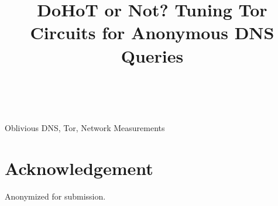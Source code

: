 \documentclass[10pt, confrerence, letterpaper]{ieeetrans}
\begin{document}
\title{DoHoT or Not? Tuning Tor Circuits for Anonymous DNS Queries}

\author{ \\
}




%
\maketitle              %
\IEEEpeerreviewmaketitle


\begin{IEEEkeywords}
Oblivious DNS, Tor, Network Measurements
\end{IEEEkeywords}









\section*{Acknowledgement}
Anonymized for submission.

\newpage

 

\appendix

\end{document}
